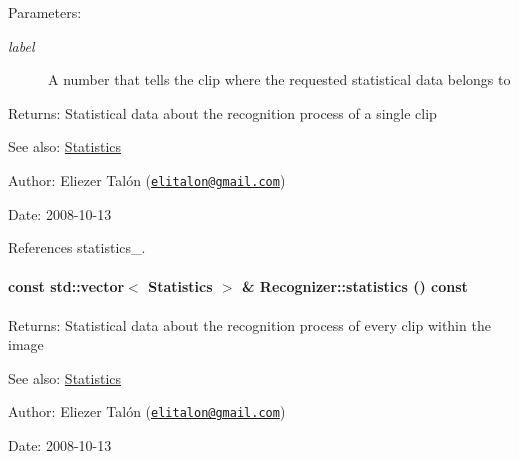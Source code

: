 \begin{Desc}
\item[Parameters:]
\begin{description}
\item[{\em label}]A number that tells the clip where the requested statistical data belongs to\end{description}
\end{Desc}
\begin{Desc}
\item[Returns:]Statistical data about the recognition process of a single clip\end{Desc}
\begin{Desc}
\item[See also:]\hyperlink{class_statistics}{Statistics}\end{Desc}
\begin{Desc}
\item[Author:]Eliezer Talón (\href{mailto:elitalon@gmail.com}{\tt elitalon@gmail.com}) \end{Desc}
\begin{Desc}
\item[Date:]2008-10-13 \end{Desc}


References statistics\_\-.\hypertarget{class_recognizer_8b38356d2741969e67cd6b4f507897ba}{
\paragraph[statistics]{\setlength{\rightskip}{0pt plus 5cm}const std::vector$<$ {\bf Statistics} $>$ \& Recognizer::statistics () const}\hfill}
\label{class_recognizer_8b38356d2741969e67cd6b4f507897ba}


\begin{Desc}
\item[Returns:]Statistical data about the recognition process of every clip within the image\end{Desc}
\begin{Desc}
\item[See also:]\hyperlink{class_statistics}{Statistics}\end{Desc}
\begin{Desc}
\item[Author:]Eliezer Talón (\href{mailto:elitalon@gmail.com}{\tt elitalon@gmail.com}) \end{Desc}
\begin{Desc}
\item[Date:]2008-10-13 \end{Desc}


